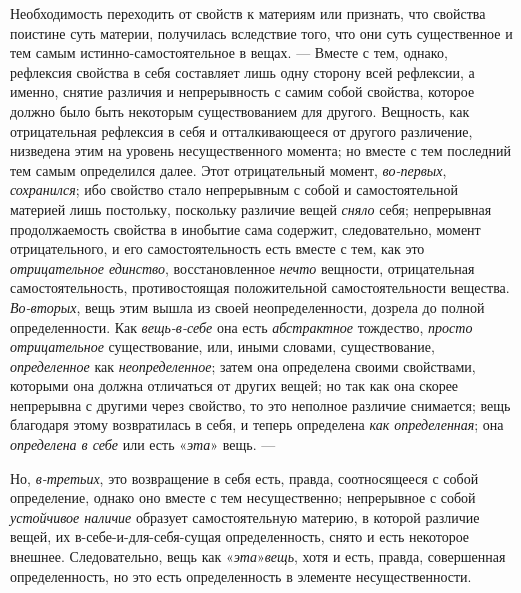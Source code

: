 Необходимость переходить от свойств к материям или признать, что свойства
поистине суть материи, получилась вследствие того, что они суть
существенное и тем самым истинно-самостоятельное в вещах. — Вместе с тем,
однако, рефлексия свойства в себя составляет лишь одну сторону всей
рефлексии, а именно, снятие различия и непрерывность с самим собой
свойства, которое должно было быть некоторым существованием для другого.
Вещность, как отрицательная рефлексия в себя и отталкивающееся от другого
различение, низведена этим на уровень несущественного момента; но вместе с
тем последний тем самым определился далее. Этот отрицательный момент,
{\em во-первых}, {\em сохранился};
ибо свойство стало непрерывным с собой и самостоятельной материей лишь
постольку, поскольку различие вещей {\em сняло} себя;
непрерывная продолжаемость свойства в инобытие сама содержит,
следовательно, момент отрицательного, и его самостоятельность есть вместе с
тем, как это {\em отрицательное единство},
восстановленное {\em нечто} вещности, отрицательная
самостоятельность, противостоящая положительной самостоятельности вещества.
{\em Во-вторых}, вещь этим вышла из своей
неопределенности, дозрела до полной определенности. Как
{\em вещь-в-себе} она есть
{\em абстрактное} тождество,
{\em просто отрицательное} существование, или, иными
словами, существование, {\em определенное} как
{\em неопределенное}; затем она определена своими
свойствами, которыми она должна отличаться от других вещей; но так как она
скорее непрерывна с другими через свойство, то это неполное различие
снимается; вещь благодаря этому возвратилась в себя, и теперь определена
{\em как определенная}; она
{\em определена в себе} или есть
«{\em эта}» вещь. —

Но, {\em в-третьих}, это возвращение в себя есть,
правда, соотносящееся с собой определение, однако оно вместе с тем
несущественно; непрерывное с собой {\em устойчивое
наличие} образует самостоятельную материю, в которой различие вещей, их
в-себе-и-для-себя-сущая определенность, снято и есть некоторое внешнее.
Следовательно, вещь как
«{\em эта}»{\em  вещь}, хотя и
есть, правда, совершенная определенность, но это есть определенность в
элементе несущественности.

